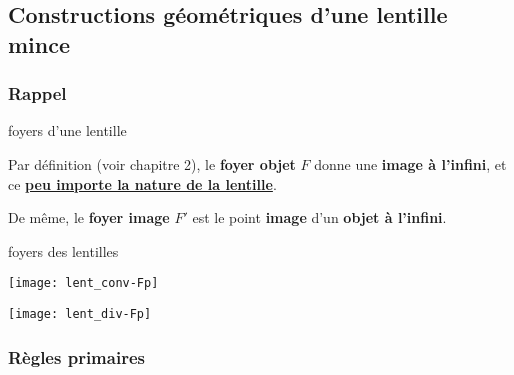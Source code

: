 \documentclass[../main/main.tex]{subfiles}
\begin{document}
\subsection{Constructions géométriques d'une lentille mince}
\subsubsection{Rappel}

\begin{rapp}[label=rapp:foy]{foyers d'une lentille}

    Par définition (voir chapitre 2), le \textbf{foyer objet} $F$ donne une
    \textbf{image à l'infini}, et ce \textbf{\underline{peu importe la nature de
    la lentille}}.\bigbreak

    De même, le \textbf{foyer image} $F'$ est le point \textbf{image} d'un
    \textbf{objet à l'infini}.

\end{rapp}
\begin{exem}[label=exem:lentfoy, sidebyside]{foyers des lentilles}
    \begin{center}
        \texttt{[image: lent\_conv-Fp]}
        \label{fig:convfp}
    \end{center}
    \tcblower
    \begin{center}
        \texttt{[image: lent\_div-Fp]}
        \label{fig:divfp}
    \end{center}
\end{exem}

\subsubsection{Règles primaires}
\end{document}
